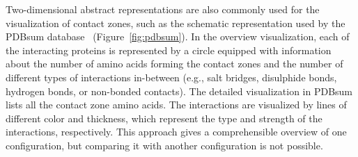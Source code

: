 \documentclass{bmcart}
\begin{document}

Two-dimensional abstract representations are also commonly used for the visualization of contact zones, such as the schematic representation used by the PDBsum database~\cite{pdbsum} (Figure~\ref{fig:pdbsum}).
In the overview visualization, each of the interacting proteins is represented by a circle equipped with information about the number of amino acids forming the contact zones and the number of different types of interactions in-between (e.g., salt bridges, disulphide bonds, hydrogen bonds, or non-bonded contacts).
The detailed visualization in PDBsum lists all the contact zone amino acids. 
The interactions are visualized by lines of different color and thickness, which represent the type and strength of the interactions, respectively. 
This approach gives a comprehensible overview of one configuration, but comparing it with another configuration is not possible.


\end{document}
